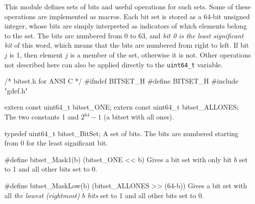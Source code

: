 
This module defines sets of bits and useful operations for such sets.
Some of these operations are implemented as macros.
Each bit set is stored as a 64-bit unsigned integer, whose bits are simply interpreted
as indicators of which elements belong to the set.
The bits are numbered from 0 to 63, and
\emph{bit 0 is the least significant bit} of this word,
which means that the bits are numbered from right to left.
%
If bit $j$ is 1, then element $j$ is a member of the set, otherwise it is not.
Other operations not described here can also be applied directly
to the \texttt{uint64\_t} variable.


\code\hide
/* bitset.h  for ANSI C */
#ifndef BITSET_H
#define BITSET_H
#include "gdef.h"
\endhide\endcode


\code

extern const uint64_t bitset_ONE;
extern const uint64_t bitset_ALLONES;
\endcode
\tab
  The two constants 1 and $2^{64}-1$ (a bitset with all ones).
\endtab
\iffalse  %
\code

extern uint64_t bitset_MASK1[];
\endcode
 \tab {\tt bitset\_MASK1[j]} has only \emph{bit} $j$ set to 1 and all other
  bits set to 0.
  \pierre{Not sure if it is worthwhile to store and retrieve all these constants.
	  See \url{http://c-faq.com/misc/bitsets.html} and
    \url{https://github.com/iplinux/x11proto-trap/blob/master/xtrapbits.h}
		for alternatives.}
 \endtab
\code

extern uint64_t bitset_MASK[];
\endcode
 \tab {\tt bitset\_MASK[j]} has all \emph{the first $j$ bits} set to 1 and all other
  bits set to 0.
 \endtab
\fi  %

\code

typedef uint64_t bitset_BitSet;
\endcode
 \tab  A set of bits. The bits are numbered starting from 0 for the least significant bit.
 \endtab



\code

#define bitset_Mask1(b) (bitset_ONE << b)
\endcode
 \tab Gives a bit set with only bit $b$ set to 1 and all other bits set to 0.
 \endtab
\code

#define bitset_MaskLow(b) (bitset_ALLONES >> (64-b))
\endcode
 \tab Gives a bit set with all \emph{the lowest (rightmost) $b$ bits} set to 1
  and all other bits set to 0.
 \endtab
\code

